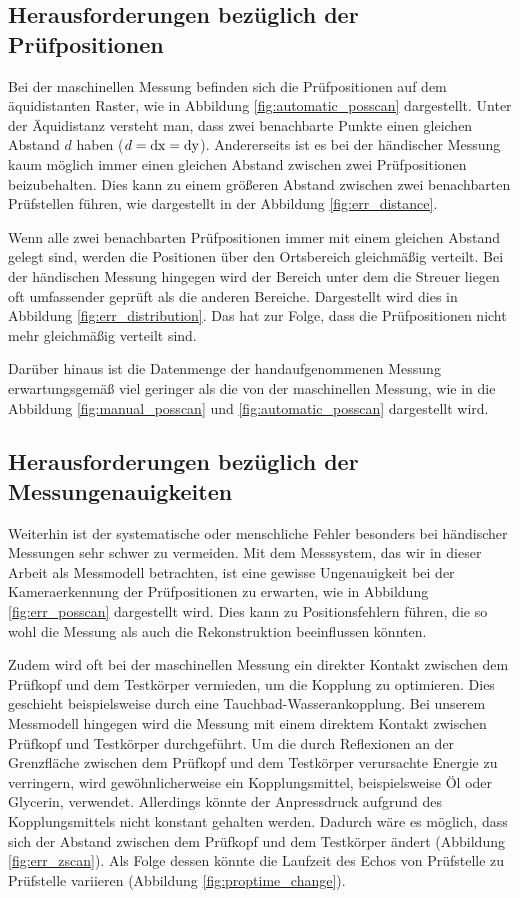 \subsection*{Herausforderungen bezüglich der Prüfpositionen}
Bei der maschinellen Messung befinden sich die Prüfpositionen auf dem äquidistanten Raster, wie in Abbildung \ref{fig:automatic_posscan} dargestellt. Unter der Äquidistanz versteht man, dass zwei benachbarte Punkte einen gleichen Abstand $d$ haben ($d = \operatorname{dx} = \operatorname{dy}$). Andererseits ist es bei der händischer Messung kaum möglich immer einen gleichen Abstand zwischen zwei Prüfpositionen beizubehalten. Dies kann zu einem größeren Abstand zwischen zwei benachbarten Prüfstellen führen, wie dargestellt in der Abbildung \ref{fig:err_distance}. \par
Wenn alle zwei benachbarten Prüfpositionen immer mit einem gleichen Abstand gelegt sind, werden die Positionen über den Ortsbereich gleichmäßig verteilt. Bei der händischen Messung hingegen wird der Bereich unter dem die Streuer liegen oft umfassender geprüft als die anderen Bereiche. Dargestellt wird dies in Abbildung \ref{fig:err_distribution}. Das hat zur Folge, dass die Prüfpositionen nicht mehr gleichmäßig verteilt sind. \par
Darüber hinaus ist die Datenmenge der handaufgenommenen Messung erwartungsgemäß viel geringer als die von der maschinellen Messung, wie in die Abbildung \ref{fig:manual_posscan} und \ref{fig:automatic_posscan} dargestellt wird.


\subsection*{Herausforderungen bezüglich der Messungenauigkeiten} 
Weiterhin ist der systematische oder menschliche Fehler besonders bei händischer Messungen sehr schwer zu vermeiden. Mit dem Messsystem, das wir in dieser Arbeit als Messmodell betrachten, ist eine gewisse Ungenauigkeit bei der Kameraerkennung der Prüfpositionen zu erwarten, wie in Abbildung \ref{fig:err_posscan} dargestellt wird. Dies kann zu Positionsfehlern führen, die so wohl die Messung als auch die Rekonstruktion beeinflussen könnten.  \par 
Zudem wird oft bei der maschinellen Messung ein direkter Kontakt zwischen dem Prüfkopf und dem Testkörper vermieden, um die Kopplung zu optimieren. Dies geschieht beispielsweise durch eine Tauchbad-Wasserankopplung. Bei unserem Messmodell hingegen wird die Messung mit einem direktem Kontakt zwischen Prüfkopf und Testkörper durchgeführt. Um die durch Reflexionen an der Grenzfläche zwischen dem Prüfkopf und dem Testkörper verursachte Energie zu verringern, wird gewöhnlicherweise ein Kopplungsmittel, beispielsweise Öl oder Glycerin, verwendet. Allerdings könnte der Anpressdruck aufgrund des Kopplungsmittels nicht konstant gehalten werden. Dadurch wäre es möglich, dass sich der Abstand zwischen dem Prüfkopf und dem Testkörper ändert (Abbildung \ref{fig:err_zscan}). Als Folge dessen könnte die Laufzeit des Echos  von Prüfstelle zu Prüfstelle variieren (Abbildung \ref{fig:proptime_change}). \par

